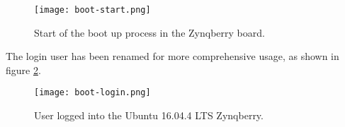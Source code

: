 \begin{figure}[htp]
	\centering
	\texttt{[image: boot-start.png]}
	\caption{Start of the boot up process in the Zynqberry board.}
	\label{fig:boot-start}
\end{figure}

The login user has been renamed for more comprehensive usage, as shown in figure 
\ref{fig:boot-login}.

\begin{figure}[htp]
	\centering
	\texttt{[image: boot-login.png]}
	\caption{User logged into the Ubuntu 16.04.4 LTS Zynqberry.}
	\label{fig:boot-login}
\end{figure}
